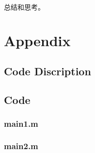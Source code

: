 \documentclass{article}
\begin{document}
总结和思考。

\section{Appendix}
\subsection{Code Discription}

\subsection{Code}
\subsubsection{main1.m}

\subsubsection{main2.m}


\end{document}
